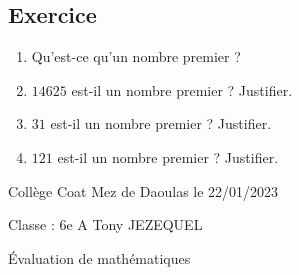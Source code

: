 \documentclass[a4paper,12pt,fleqn]{article}
\newcounter{exo}          				%
\newcommand{\exo}{					%
  	\stepcounter{exo}        			%
  	\subsection*{Exercice \no{}\theexo}}
\newcommand{\titreitem}[1]{
\Ovalbox{\makebox[.99\linewidth][l]{{Compétence : {#1} }}}
\vspace{0.3cm}} %
\begin{document}
\vspace{0.5cm}

\medskip
\begin{minipage}{0.99\linewidth}

\exo



\begin{enumerate}

\item Qu'est-ce qu'un nombre premier ?

\item $14 625$ est-il un nombre premier ? Justifier.

\item $31$ est-il un nombre premier ? Justifier.

\item $121$ est-il un nombre premier ? Justifier.

\end{enumerate}

\end{minipage}

\vspace{0.5cm}

\medskip
\newpage
\setcounter{exo}{0}


Collège Coat Mez de Daoulas  \hfill  le 22/01/2023

Classe : 6e A \hfill Tony JEZEQUEL

\begin{center}
\begin{LARGE} Évaluation de mathématiques \end{LARGE}
\end{center}

\end{document}
